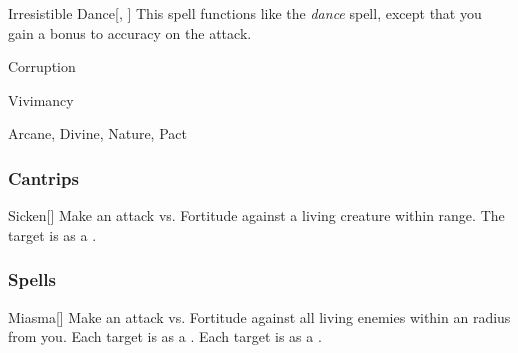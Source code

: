 \lowercase{\hypertarget{spell:Irresistible Dance}{}}\label{spell:Irresistible Dance}
\begin{apability}[\nth{6}]{\hypertarget{spell:Irresistible Dance}{Irresistible Dance}}[, ]
This spell functions like the \textit{dance} spell, except that you gain a  bonus to accuracy on the attack.
\end{apability}
\vspace{0.25em}


\newpage
\begin{spellsection}{Corruption}

\begin{spellheader}
\end{spellheader}


 Vivimancy

 Arcane, Divine, Nature, Pact

\subsubsection{Cantrips}


\begin{freeability}{Sicken}[]
Make an attack vs. Fortitude against a living creature within \rngclose range.
\hit The target is  as a .
\end{freeability}

\end{spellsection}


\subsubsection{Spells}


\lowercase{\hypertarget{spell:Miasma}{}}\label{spell:Miasma}
\begin{apability}[\nth{1}]{\hypertarget{spell:Miasma}{Miasma}}[]
Make an attack vs. Fortitude against all living enemies within an \areamed radius from you.
\hit Each target is  as a .
\crit Each target is  as a .
\end{apability}
\vspace{0.25em}



